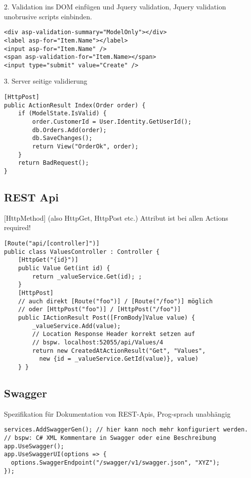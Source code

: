 \begin{multicols*}{2}
2. Validation ins DOM einfügen und Jquery validation, Jquery validation unobrusive scripts einbinden.
\begin{verbatim}
<div asp-validation-summary="ModelOnly"></div>
<label asp-for="Item.Name"></label>
<input asp-for="Item.Name" />
<span asp-validation-for="Item.Name></span>
<input type="submit" value="Create" />
\end{verbatim}

3. Server seitige validierung
\begin{verbatim}
[HttpPost]
public ActionResult Index(Order order) {
    if (ModelState.IsValid) {
        order.CustomerId = User.Identity.GetUserId();
        db.Orders.Add(order);
        db.SaveChanges();
        return View("OrderOk", order);
    }
    return BadRequest();
}
\end{verbatim}

\subsection{REST Api}
[HttpMethod] (also HttpGet, HttpPost etc.) Attribut ist bei allen Actions required!
\begin{verbatim}
[Route("api/[controller]")]
public class ValuesController : Controller {
    [HttpGet("{id}")]
    public Value Get(int id) {
        return _valueService.Get(id); ;
    }
    [HttpPost]
    // auch direkt [Route("foo")] / [Route("/foo")] möglich
    // oder [HttpPost("foo")] / [HttpPost("/foo")]
    public IActionResult Post([FromBody]Value value) {
        _valueService.Add(value);
        // Location Response Header korrekt setzen auf
        // bspw. localhost:52055/api/Values/4
        return new CreatedAtActionResult("Get", "Values",
          new {id = _valueService.GetId(value)}, value)
    } }
\end{verbatim}

\subsection{Swagger}
Spezifikation für Dokumentation von REST-Apis, Prog-sprach unabhängig
\begin{verbatim}
services.AddSwaggerGen(); // hier kann noch mehr konfiguriert werden.
// bspw: C# XML Kommentare in Swagger oder eine Beschreibung
app.UseSwagger();
app.UseSwaggerUI(options => {
  options.SwaggerEndpoint("/swagger/v1/swagger.json", "XYZ");
});
\end{verbatim}


\end{multicols*}
